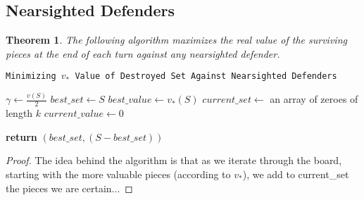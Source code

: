 \documentclass{article}
\theoremstyle{plain}
\newtheorem{thm}{Theorem}[section]
\theoremstyle{definition}
\theoremstyle{remark}
\begin{document}
\subsection{Nearsighted Defenders}

\begin{thm}
  The following algorithm maximizes the real value of the surviving pieces at the end of each turn against any nearsighted defender.
\end{thm}



\begin{center}
  \begin{minipage}{1\linewidth} %
    \begin{algorithm}[H]

      \caption{\texttt{Minimizing $v_{*}$ Value of Destroyed Set Against Nearsighted Defenders}} %
      \label{alg:nearsighted}   %


      \medskip
      $\gamma \leftarrow \frac{v(S)}{2}$\;
      $best\_set \leftarrow S$\;
      $best\_value \leftarrow v_{*}(S)$\;
      $current\_set \leftarrow $ an array of zeroes of length $k$\;
      $current\_value \leftarrow 0$\;
      \medskip

       {
         {
        }
      }
     \medskip
      {\bf return} $(best\_set, (S - best\_set))$\;
    \end{algorithm}
  \end{minipage}
\end{center}

\begin{proof}
The idea behind the algorithm is that as we iterate through the board, starting with the more valuable pieces (according to $v_{*}$), we add to current\_set the pieces we are certain...


\end{proof}
\end{document}
